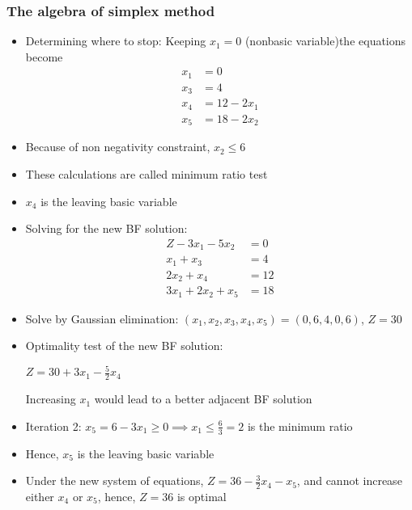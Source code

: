 \documentclass[12pt]{article}
\begin{document}
  \subsubsection*{The algebra of simplex method}
  \begin{itemize}
  \item Determining where to stop: Keeping $x_1=0$ (nonbasic variable)the equations become
    \begin{align*}
      x_1 &= 0 \\
      x_3 &= 4 \\
      x_4 &= 12 - 2 x_1 \\
      x_5 &= 18 - 2 x_2 
    \end{align*}
  \item Because of non negativity constraint, $x_2 \le 6$
  \item These calculations are called minimum ratio test
  \item $x_4$ is the leaving basic variable
  \end{itemize}



  \begin{itemize}
  \item Solving for the new BF solution:
    \begin{align*}
      Z-3 x_1-5 x_2       & = 0  \\
      x_1+x_3             & = 4  \\
      2 x_2 + x_4         & = 12 \\
      3 x_1 + 2 x_2 + x_5 & = 18 
    \end{align*}
\item Solve by Gaussian elimination: $(x_1,x_2,x_3,x_4,x_5) = (0,6,4,0,6)$, $Z=30$
  \end{itemize}



  \begin{itemize}
  \item Optimality test of the new BF solution: 

    $Z = 30 + 3 x_1 - \frac{5}{2}x_4$

    Increasing $x_1$ would lead to a better adjacent BF solution
  \item Iteration 2: $x_5 = 6 - 3 x_1 \ge 0 \implies x_1 \le \frac{6}{3} = 2$ is the minimum ratio
  \item Hence, $x_5$ is the leaving basic variable
  \item Under the new system of equations, $Z=36-\frac{3}{2}x_4-x_5$, and cannot increase either $x_4$ or $x_5$, hence, $Z=36$ is optimal
  \end{itemize}
\end{document}
